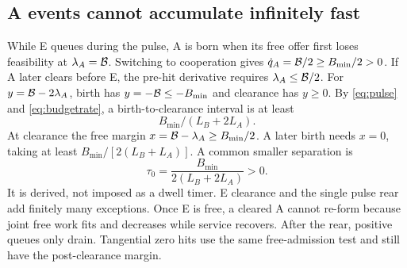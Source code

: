 \subsection{A events cannot accumulate infinitely fast}
While E queues during the pulse, A is born when its free offer first loses
feasibility at $\lambda_A=\mathcal B$. Switching to cooperation gives
$\dot q_A=\mathcal B/2\geq B_{\min}/2>0$. If A later clears before E,
the pre-hit derivative requires $\lambda_A\leq\mathcal B/2$.
For $y=\mathcal B-2\lambda_A$, birth has $y=-\mathcal B\leq-B_{\min}$
and clearance has $y\geq0$. By \eqref{eq:pulse} and
\eqref{eq:budgetrate}, a birth-to-clearance interval is at least
\begin{equation}
 B_{\min}/(L_B+2L_A). \label{eq:birthclear}
\end{equation}
At clearance the free margin $x=\mathcal B-\lambda_A\geq B_{\min}/2$.
A later birth needs $x=0$, taking at least $B_{\min}/[2(L_B+L_A)]$.
A common smaller separation is
\begin{equation}
 \tau_0=\frac{B_{\min}}{2(L_B+2L_A)}>0. \label{eq:eventseparation}
\end{equation}
It is derived, not imposed as a dwell timer. E clearance and the single
pulse rear add finitely many exceptions. Once E is free, a cleared A cannot
re-form because joint free work fits and decreases while service recovers.
After the rear, positive queues only drain. Tangential zero hits use the
same free-admission test and still have the post-clearance margin.

